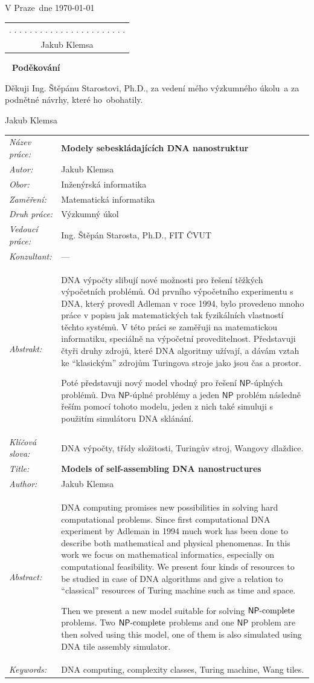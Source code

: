 \documentclass[a4paper, 11pt]{report}
\theoremstyle{definition}
\theoremstyle{remark}
\newcommand{\NP}{\mathsf{NP}}
\newcommand{\NPC}{\mathsf{NP}\textnormal{-complete}}
\newcommand{\obor}{Inženýrská informatika}
\newcommand{\minf}{Matematická informatika}
\newcommand{\TypPrace}{Výzkumný úkol}
\newcommand{\mePrace}{mého výzkumného úkolu}
\newcommand{\kohoCoPraci}{ho}
\newcommand{\nazevcz}{Modely sebeskládajících DNA nanostruktur}
\newcommand{\nazeven}{Models of self-assembling DNA nanostructures}
\newcommand{\autor}{Jakub Klemsa}
\newcommand{\vedouci}{Ing. Štěpán Starosta, Ph.D.}
\newcommand{\vedoucimu}{Ing. Štěpánu Starostovi, Ph.D.}
\newcommand{\pracovisteVed}{FIT ČVUT}
\newcommand{\konzultant}{---}
\newcommand{\vMiste}{Praze}
\newcommand{\klicova}{DNA výpočty, třídy složitosti, Turingův stroj, Wangovy dlaždice.}
\newcommand{\keyword}{DNA computing, complexity classes, Turing machine, Wang tiles.}
\newcommand{\abstrCZ}{DNA výpočty slibují nové možnosti pro řešení těžkých výpočetních problémů. Od prvního výpočetního experimentu s DNA, který provedl Adleman v roce 1994, bylo provedeno mnoho práce v popisu jak matematických tak fyzikálních vlastností těchto systémů. V této práci se zaměřuji na matematickou informatiku, speciálně na výpočetní proveditelnost. Představuji čtyři druhy zdrojů, které DNA algoritmy užívají, a dávám vztah ke ``klasickým'' zdrojům Turingova stroje jako jsou čas a prostor.

Poté představuji nový model vhodný pro řešení $\NP$-úplných problémů. Dva $\NP$-úplné problémy a jeden $\NP$ problém následně řeším pomocí tohoto modelu, jeden z nich také simuluji s použitím simulátoru DNA sklánání.}
\newcommand{\abstrEN}{DNA computing promises new possibilities in solving hard computational problems. Since first computational DNA experiment by Adleman in 1994 much work has been done to describe both mathematical and physical phenomenas. In this work we focus on mathematical informatics, especially on computational feasibility. We present four kinds of resources to be studied in case of DNA algorithms and give a relation to ``classical'' resources of Turing machine such as time and space.

Then we present a new model suitable for solving $\NPC$ problems. Two $\NPC$ problems and one $\NP$ problem are then solved using this model, one of them is also simulated using DNA tile assembly simulator.}
\begin{document}
\begin{titlepage}
\noindent
\vspace{5mm}V \vMiste ~dne \today\hfill
	\begin{tabular}{c}
	. . . . . . . . . . . . . . . . . . . . . . .\\
	\autor
	\end{tabular}
\newpage


\thispagestyle{empty}
~
\vfill
\noindent\textbf{Poděkování}
\vspace{0.5cm}

\noindent
Děkuji \vedoucimu, za vedení \mePrace ~a za podnětné návrhy, které \kohoCoPraci ~obohatily.

\begin{flushright}
\autor
\end{flushright}
\newpage


\thispagestyle{empty}

\begin{tabularx}{\textwidth}{lX}
  {\em Název práce:} & \bf \nazevcz \\[4mm]
  {\em Autor:} & \autor \\[4mm]
  {\em Obor:} & \obor \\[4mm]
  {\em Zaměření:} & \minf \\[4mm]
  {\em Druh práce:} & \TypPrace \\[4mm]
  {\em Vedoucí práce:} & \vedouci, \pracovisteVed \\[4mm]
  {\em Konzultant:} & \konzultant \\[4mm]
  {\em Abstrakt:} & \abstrCZ \\[4mm]
  {\em Klíčová slova:} & \klicova \\[20mm]

  {\em Title:} & \bf \nazeven \\[4mm]
  {\em Author:} & \autor \\[4mm]
  {\em Abstract:} & \abstrEN \\[4mm]
  {\em Keywords:} & \keyword
\end{tabularx}
\newpage




\tableofcontents
\thispagestyle{empty}

\end{titlepage}


		
\end{document}
